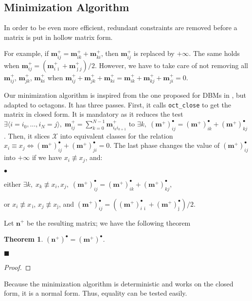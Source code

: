 \documentclass[twosides]{report}
\makeatletter
\newenvironment{mylist}
        {\vskip-3mm\begin{list}{$\bullet$}{\setlength{\leftmargin}{.5cm}}}
        {\end{list}}
\newcommand{\findex}[1]{\index{#1@{\tt #1}}}
\renewcommand{\vec}[1]{{{\mathbf #1}}}
\newcommand{\itop}{{\,\bar{\imath}}}
\newcommand{\jtop}{{\bar{\jmath}}}
\newtheorem{theorem}{Theorem}
\newenvironment{mytheorem}
      {\vspace*{0.2cm}\par\begin{theorem}}
      {\par\vspace*{-0.2cm}\hfill$\blacksquare$\end{theorem}}
\newenvironment{myproof}
      {\begin{proof}}
      {\end{proof}}
\makeatother
\begin{document}
\subsection{Minimization Algorithm}
\findex{oct\_m\_from\_oct}
\label{minimization}
In order to be even more efficient, redundant constraints are removed before
a matrix is put in hollow matrix form.

For example, if $\vec{m}^+_{ij}=\vec{m}^+_{ik}+\vec{m}^+_{ki}$, then 
$\vec{m}^+_{ij}$ is replaced by $+\infty$.
The same holds when 
$\vec{m}^+_{ij}=(\vec{m}^+_{i\itop}+\vec{m}^+_{\jtop j})/2$.
However, we have to take care of not removing all $\vec{m}^+_{ij}$,
$\vec{m}^+_{jk}$, $\vec{m}^+_{ki}$ when
$\vec{m}^+_{ij}+\vec{m}^+_{jk}+\vec{m}^+_{ki}=
\vec{m}^+_{ik}+\vec{m}^+_{kj}+\vec{m}^+_{ji}=0$.

Our minimization algorithm is inspired from the one proposed for DBMs
in \cite{DBM}, but adapted to octagons.
It has three passes.
First, it calls {\tt oct\_close} to get the matrix in closed form.
It is mandatory as it reduces the test
$\exists \langle i=i_0,\ldots,i_N=j\rangle,\;\vec{m}^+_{ij}=\sum_{k=0}^{N-1}\vec{m}^+_{i_k i_{k+1}}$ 
to $\exists k,\;(\vec{m}^+)^\bullet_{ij}=(\vec{m}^+)^\bullet_{ik}+(\vec{m}^+)^\bullet_{kj}$.
Then, it slices $\mathcal{X}$ into equivalent classes for the relation
$x_i\equiv x_j\iff (\vec{m}^+)^\bullet_{ij}+(\vec{m}^+)^\bullet_{ji}=0$.
The last phase changes the value of $(\vec{m}^+)^\bullet_{ij}$ 
into $+\infty$ if we have $x_i\not\equiv x_j$, and:
\begin{mylist}
\item either
$\exists k,\;x_k\not\equiv x_i,x_j,\;(\vec{m}^+)^\bullet_{ij}=(\vec{m}^+)^\bullet_{ik}+(\vec{m}^+)^\bullet_{kj}$,
\item or $x_i\not\equiv x_{\itop}$, $x_j\not\equiv x_{\jtop}$, and
$(\vec{m}^+)^\bullet_{ij}=((\vec{m}^+)^\bullet_{i\itop}+(\vec{m}^+)^\bullet_{\jtop})/2$.
\end{mylist}

Let $\vec{n}^+$ be the resulting matrix; we have the following theorem
\begin{mytheorem}
$(\vec{n}^+)^\bullet=(\vec{m}^+)^\bullet$.
\end{mytheorem}
\begin{myproof}
\end{myproof}

\medskip

Because the minimization algorithm is deterministic and works on 
the closed form, it is a normal form.
Thus, equality can be tested easily.
\end{document}
